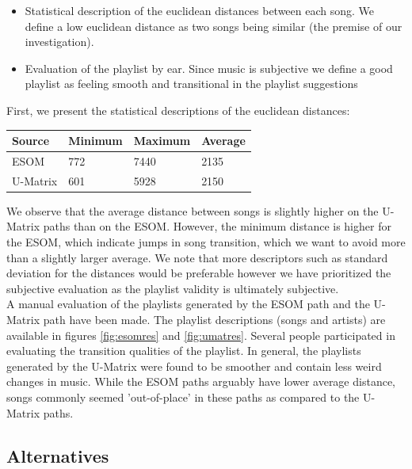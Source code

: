 \begin{itemize}
\item Statistical description of the euclidean distances between each song. We define a low euclidean distance as two songs being similar (the premise of our investigation).\\
\item Evaluation of the playlist by ear. Since music is subjective we define a good playlist as feeling smooth and transitional in the playlist suggestions \\
\end{itemize}

First, we present the statistical descriptions of the euclidean distances: 

\begin{center}
    \begin{tabular}{  l | l | l | p{5cm} }
    Source & Minimum & Maximum & Average  \\ \hline
    ESOM & 772 & 7440 & 2135 \\ 
    U-Matrix & 601 & 5928 & 2150 \\ 
    \end{tabular}
\end{center}

We observe that the average distance between songs is slightly higher on the U-Matrix paths than on the ESOM. However, the minimum distance is higher for the ESOM, which indicate jumps in song transition, which we want to avoid more than a slightly larger average. We note that more descriptors such as standard deviation for the distances would be  preferable however we have prioritized the subjective evaluation as the playlist validity is ultimately subjective.\\

A manual evaluation of the playlists generated by the ESOM path and the U-Matrix path have been made. The playlist descriptions (songs and artists) are available in  figures \ref{fig:esomres} and \ref{fig:umatres}. Several people participated in evaluating the transition qualities of the playlist. In general, the playlists generated by the U-Matrix were found to be smoother and contain less weird changes in music. While the ESOM paths arguably have lower average distance, songs commonly seemed 'out-of-place' in these paths as compared to the U-Matrix paths. \\

\subsection{Alternatives}

